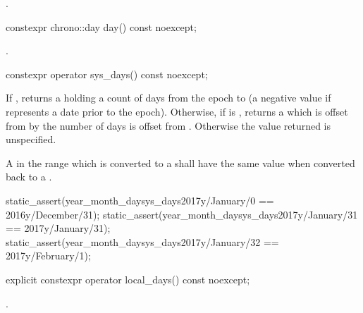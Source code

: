 \begin{itemdescr}
\pnum
\returns {}.
\end{itemdescr}

%
\begin{itemdecl}
constexpr chrono::day day() const noexcept;
\end{itemdecl}

\begin{itemdescr}
\pnum
\returns {}.
\end{itemdescr}

%
\begin{itemdecl}
constexpr operator sys_days() const noexcept;
\end{itemdecl}

\begin{itemdescr}
\pnum
\returns
If ,
returns a 
holding a count of days from the  epoch to 
(a negative value if  represents a date prior to the  epoch).
Otherwise, if  is ,
returns a 
which is offset from 
by the number of days  is offset from .
Otherwise the value returned is unspecified.

\pnum
\remarks
A  in the range 
which is converted to a 
shall have the same value when converted back to a .

\pnum
\begin{example}
\begin{codeblock}
static_assert(year_month_day{sys_days{2017y/January/0}}  == 2016y/December/31);
static_assert(year_month_day{sys_days{2017y/January/31}} == 2017y/January/31);
static_assert(year_month_day{sys_days{2017y/January/32}} == 2017y/February/1);
\end{codeblock}
\end{example}
\end{itemdescr}

%
\begin{itemdecl}
explicit constexpr operator local_days() const noexcept;
\end{itemdecl}

\begin{itemdescr}
\pnum
\returns {}.
\end{itemdescr}

